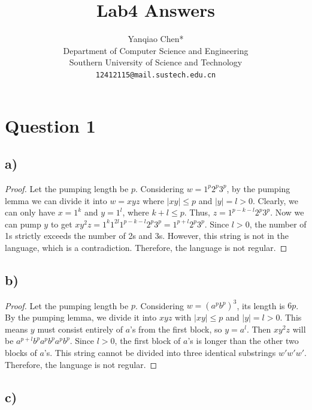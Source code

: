 \documentclass[a4paper, UTF-8]{article}
\theoremstyle{plain}
\begin{document}
\title{\bf{Lab4 Answers}}

\author{Yanqiao Chen*\\ 
  Department of Computer Science and Engineering\\
  Southern University of Science and Technology\\
  \texttt{12412115@mail.sustech.edu.cn}
  }

\maketitle

\section{Question 1} 

\subsection{a)} 

\begin{proof}
Let the pumping length be $p$.
Considering $w = 1^p 2^p 3^p$, by the pumping lemma we can divide it into $w = xyz$ where $|xy| \leq p$ and $|y| = l > 0$.
Clearly, we can only have $x = 1^k$ and $y = 1^l$, where $k + l \leq p$.
Thus, $z = 1^{p-k-l} 2^p 3^p$.
Now we can pump $y$ to get $x y^2 z = 1^k 1^{2l} 1^{p-k-l} 2^p 3^p = 1^{p + l} 2^p 3^p$.
Since $l > 0$, the number of 1s strictly exceeds the number of 2s and 3s. However, this string is not in the language, which is a contradiction. Therefore, the language is not regular.
\end{proof} 

\subsection{b)}

\begin{proof} 
Let the pumping length be $p$. Considering $w = (a^{p}b^p)^3$, its length is $6p$.
By the pumping lemma, we divide it into $xyz$ with $|xy| \leq p$ and $|y| = l > 0$.
This means $y$ must consist entirely of $a$'s from the first block, so $y = a^l$.
Then $xy^2z$ will be $a^{p + l} b^p a^p b^p a^p b^p$.
Since $l > 0$, the first block of $a$'s is longer than the other two blocks of $a$'s. This string cannot be divided into three identical substrings $w'w'w'$.
Therefore, the language is not regular.
\end{proof}

\subsection{c)} 
\end{document}
